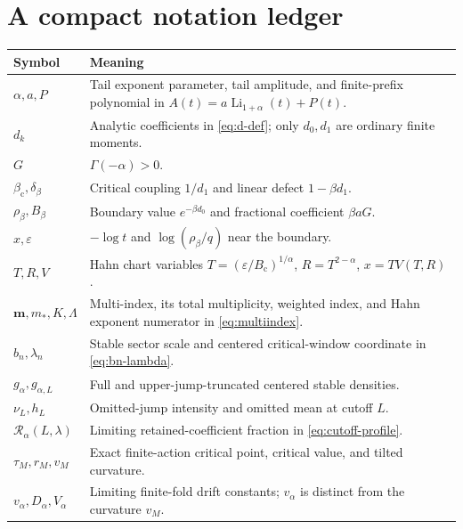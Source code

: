 \documentclass[11pt,a4paper]{article}
\numberwithin{equation}{section}
\theoremstyle{definition}
\theoremstyle{remark}
\DeclareMathOperator{\Li}{Li}
\newcommand{\bc}{\beta_{\mathrm c}}
\newcommand{\Bc}{B_{\mathrm c}}
\newcommand{\m}{\boldsymbol m}
\newcommand{\Ra}{\mathcal R_\alpha}
\begin{document}
\section{A compact notation ledger}
\small
\begin{longtable}{@{}p{}p{}@{}}
\toprule
Symbol & Meaning\\
\midrule
\endhead
$\alpha,a,P$ & Tail exponent parameter, tail amplitude, and finite-prefix
polynomial in $A(t)=a\Li_{1+\alpha}(t)+P(t)$.\\[3pt]
$d_k$ & Analytic coefficients in \eqref{eq:d-def}; only $d_0,d_1$ are
ordinary finite moments.\\[3pt]
$G$ & $\Gamma(-\alpha)>0$.\\[3pt]
$\bc,\delta_\beta$ & Critical coupling $1/d_1$ and linear defect
$1-\beta d_1$.\\[3pt]
$\rho_\beta,B_\beta$ & Boundary value $e^{-\beta d_0}$ and fractional
coefficient $\beta aG$.\\[3pt]
$x,\varepsilon$ & $-\log t$ and $\log(\rho_\beta/q)$ near the boundary.\\[3pt]
$T,R,V$ & Hahn chart variables
$T=(\varepsilon/\Bc)^{1/\alpha}$, $R=T^{2-\alpha}$,
$x=TV(T,R)$.\\[3pt]
$\m,m_*,K,\Lambda$ & Multi-index, its total multiplicity, weighted index,
and Hahn exponent numerator in \eqref{eq:multiindex}.\\[3pt]
$b_n,\lambda_n$ & Stable sector scale and centered critical-window
coordinate in \eqref{eq:bn-lambda}.\\[3pt]
$g_\alpha,g_{\alpha,L}$ & Full and upper-jump-truncated centered stable
densities.\\[3pt]
$\nu_L,h_L$ & Omitted-jump intensity and omitted mean at cutoff $L$.\\[3pt]
$\Ra(L,\lambda)$ & Limiting retained-coefficient fraction in
\eqref{eq:cutoff-profile}.\\[3pt]
$\tau_M,r_M,v_M$ & Exact finite-action critical point, critical value,
and tilted curvature.\\[3pt]
$v_\alpha,D_\alpha,V_\alpha$ & Limiting finite-fold drift constants;
$v_\alpha$ is distinct from the curvature $v_M$.\\
\bottomrule
\end{longtable}
\normalsize
\end{document}
